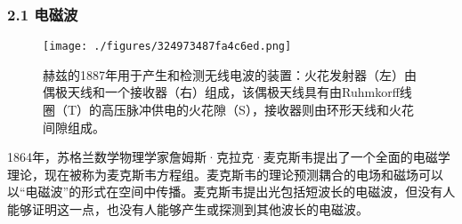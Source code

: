 \subsubsection{2.1 电磁波}
\begin{figure}[ht]
\centering
\texttt{[image: ./figures/324973487fa4c6ed.png]}
\caption{赫兹的1887年用于产生和检测无线电波的装置：火花发射器（左）由偶极天线和一个接收器（右）组成，该偶极天线具有由Ruhmkorff线圈（T）的高压脉冲供电的火花隙（S），接收器则由环形天线和火花间隙组成。} \label{fig_Hertz_1}
\end{figure}
1864年，苏格兰数学物理学家詹姆斯·克拉克·麦克斯韦提出了一个全面的电磁学理论，现在被称为麦克斯韦方程组。麦克斯韦的理论预测耦合的电场和磁场可以以“电磁波”的形式在空间中传播。麦克斯韦提出光包括短波长的电磁波，但没有人能够证明这一点，也没有人能够产生或探测到其他波长的电磁波。

